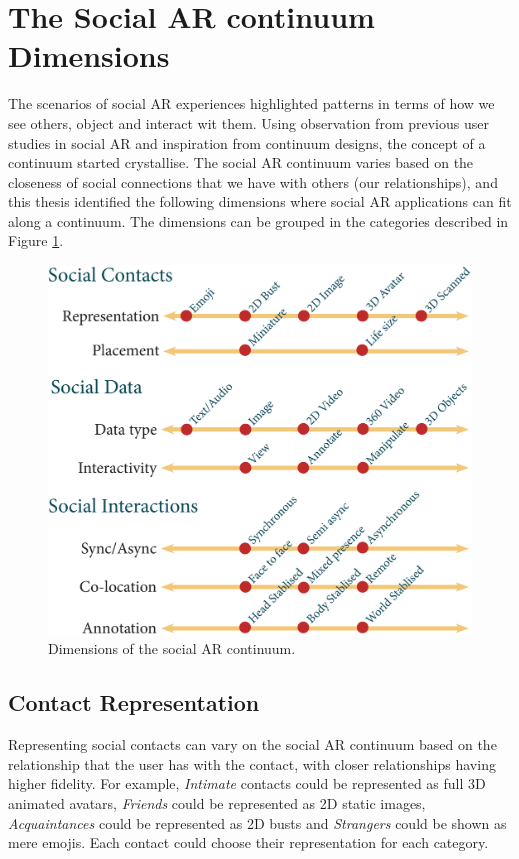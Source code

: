 \section{The Social AR continuum Dimensions}

The scenarios of social AR experiences highlighted patterns in terms of how we see others, object and interact wit them. 
Using observation from previous user studies in social AR and inspiration from continuum designs, the concept of a continuum started crystallise. 
The social AR continuum varies based on the closeness of social connections that we have with others (our relationships), and this thesis identified the following dimensions where social AR applications can fit along a continuum. The dimensions can be grouped in the categories described in Figure \ref{fig:continuum:dimensions}.

\begin{figure}[h]
    \centering
    \includegraphics[width=.8\linewidth]{images/continuum4_1.eps}
    \caption{Dimensions of the social AR continuum.}
    \label{fig:continuum:dimensions}
\end{figure}

\subsection{Contact Representation}

Representing social contacts can vary on the social AR continuum based on the relationship that the user has with the contact, with closer relationships having higher fidelity. For example, \textit{Intimate} contacts could be represented as full 3D animated avatars, \textit{Friends} could be represented as 2D static images, \textit{Acquaintances} could be represented as 2D busts and \textit{Strangers} could be shown as mere emojis. Each contact could choose their representation for each category.

